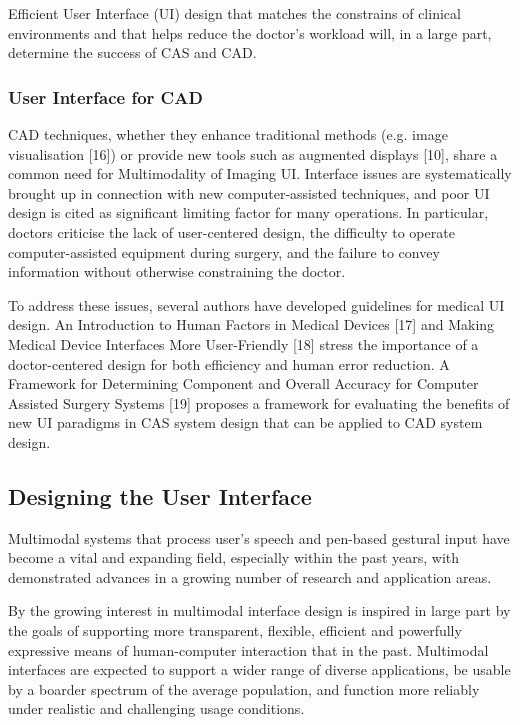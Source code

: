 Efficient User Interface (UI) design that matches the constrains of clinical environments and that helps reduce the doctor's workload will, in a large part, determine the success of CAS and CAD.

\subsubsection{User Interface for CAD}

CAD techniques, whether they enhance traditional methods (e.g. image visualisation [16]) or provide new tools such as augmented displays [10], share a common need for Multimodality of Imaging UI. Interface issues are systematically brought up in connection with new computer-assisted techniques, and poor UI design is cited as significant limiting factor for many operations. In particular, doctors criticise the lack of user-centered design, the difficulty to operate computer-assisted equipment during surgery, and the failure to convey information without otherwise constraining the doctor.

To address these issues, several authors have developed guidelines for medical UI design. An Introduction to Human Factors in Medical Devices [17] and Making Medical Device Interfaces More User-Friendly [18] stress the importance of a doctor-centered design for both efficiency and human error reduction. A Framework for Determining Component and Overall Accuracy for Computer Assisted Surgery Systems [19] proposes a framework for evaluating the benefits of new UI paradigms in CAS system design that can be applied to CAD system design.

\clearpage

\subsection{Designing the User Interface}

Multimodal systems that process user's speech and pen-based gestural input have become a vital and expanding field, especially within the past years, with demonstrated advances in a growing number of research and application areas.

By the growing interest in multimodal interface design is inspired in large part by the goals of supporting more transparent, flexible, efficient and powerfully expressive means of human-computer interaction that in the past. Multimodal interfaces are expected to support a wider range of diverse applications, be usable by a boarder spectrum of the average population, and function more reliably under realistic and challenging usage conditions.

